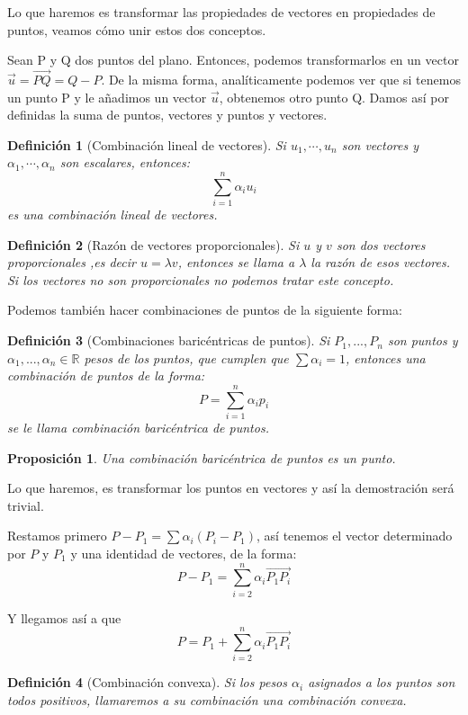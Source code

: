 \documentclass[11pt, a4paper, titlepage]{article}
\makeatletter
\renewenvironment{proof}[1][\proofname] {\vspace{-15pt}\par\pushQED{\qed}\normalfont\topsep6\p@\@plus6\p@\relax\trivlist\item[\hskip\labelsep\it#1\@addpunct{.}]\ignorespaces}{\popQED\endtrivlist\@endpefalse}
\newcommand{\R}{\mathbb{R}}
\theoremstyle{theorem-style}
\newtheorem*{nprop}{Proposición}
\theoremstyle{definition-style}
\newtheorem*{ndef}{Definición}
\theoremstyle{remark-style}
\theoremstyle{example-style}
\makeatother
\begin{document}
Lo que haremos es transformar las propiedades de vectores en propiedades de puntos, veamos cómo unir estos dos conceptos.

Sean P y Q dos puntos del plano. Entonces, podemos transformarlos en un vector $\vec{u} = \overrightarrow{PQ} = Q-P$. De la misma forma, analíticamente podemos ver que si tenemos un punto P y le añadimos un vector $\vec{u}$, obtenemos otro punto Q. Damos así por definidas la suma de puntos, vectores y puntos y vectores.

\begin{ndef}[Combinación lineal de vectores]
	Si $u_1,\cdots , u_n$ son vectores y $\alpha_1,\cdots, \alpha_n$ son escalares, entonces:
	\[
	\sum_{i=1}^n \alpha_i u_i
	\]
	es una combinación lineal de vectores.
\end{ndef}

\begin{ndef}[Razón de vectores proporcionales]
	Si $u$ y $v$ son dos vectores proporcionales ,es decir $u = \lambda v$, entonces se llama a $\lambda$ la razón de esos vectores.
	Si los vectores no son proporcionales no podemos tratar este concepto.
\end{ndef}
Podemos también hacer combinaciones de puntos de la siguiente forma:
\begin{ndef}[Combinaciones baricéntricas de puntos]
	Si $P_1,...,P_n$ son puntos y $\alpha_1,...,\alpha_n \in \R$ pesos de los puntos, que cumplen que $\sum \alpha_i = 1$, entonces una combinación de puntos de la forma:
	\[
	P = \sum_{i=1}^n \alpha_i p_i
	\]
	se le llama combinación baricéntrica de puntos.
\end{ndef}
\begin{nprop} Una combinación baricéntrica de puntos es un punto. 
\end{nprop}
\begin{proof}
	Lo que haremos, es transformar los puntos en vectores y así la demostración será trivial.

	Restamos primero $P-P_1 = \sum \alpha_i(P_i-P_1)$, así tenemos el vector determinado por $P$ y $P_1$ y una identidad de vectores, de la forma:
	\[
	P-P_1 = \sum_{i=2}^n \alpha_i \overrightarrow{P_1P_i}
	\]

	Y llegamos así a que
	\[
	P = P_1 + \sum_{i=2}^n \alpha_i \overrightarrow{P_1P_i}
	\]
\end{proof}

\begin{ndef}[Combinación convexa]
	Si los pesos $\alpha_i$ asignados a los puntos son todos positivos, llamaremos a su combinación una combinación convexa.
\end{ndef}
\end{document}
